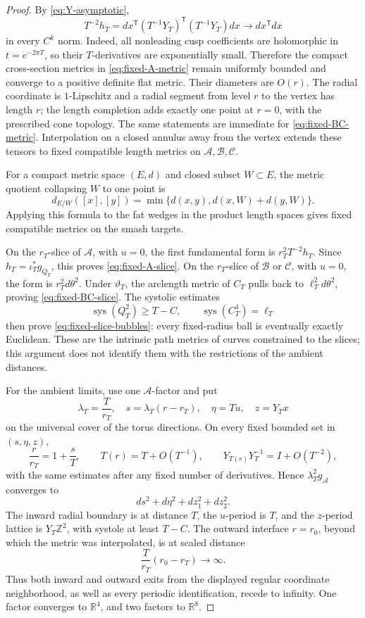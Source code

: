 \documentclass[11pt,letterpaper]{article}
\numberwithin{equation}{section}
\theoremstyle{definition}
\theoremstyle{remark}
\newcommand{\R}{\mathbb R}
\newcommand{\Z}{\mathbb Z}
\newcommand{\sys}{\operatorname{sys}}
\begin{document}
\begin{proof}
By \cref{eq:Y-asymptotic},
\[
 T^{-2}h_T
 =dx^{\mathsf T}(T^{-1}Y_T)^{\mathsf T}(T^{-1}Y_T)dx
 \longrightarrow dx^{\mathsf T}dx
\]
in every \(C^k\) norm.  Indeed, all nonleading cusp coefficients are
holomorphic in \(t=e^{-2\pi T}\), so their \(T\)-derivatives are
exponentially small.  Therefore the compact cross-section metrics in
\cref{eq:fixed-A-metric} remain uniformly bounded and converge to a
positive definite flat metric.  Their diameters are \(O(r)\).  The radial
coordinate is \(1\)-Lipschitz and a radial segment from level \(r\) to the
vertex has length \(r\); the length completion adds exactly one point at
\(r=0\), with the prescribed cone topology.  The same statements are
immediate for \cref{eq:fixed-BC-metric}.  Interpolation on a closed
annulus away from the vertex extends these tensors to fixed compatible
length metrics on \(\mathcal A,\mathcal B,\mathcal C\).

For a compact metric space \((E,d)\) and closed subset \(W\subset E\),
the metric quotient collapsing \(W\) to one point is
\[
 d_{E/W}([x],[y])
 =\min\{d(x,y),d(x,W)+d(y,W)\}.
\]
Applying this formula to the fat wedges in the product length spaces
gives fixed compatible metrics on the smash targets.

On the \(r_T\)-slice of \(\mathcal A\), with \(u=0\), the first
fundamental form is \(r_T^2T^{-2}h_T\).  Since
\(h_T=\iota_T^*g_{Q_T}\), this proves \cref{eq:fixed-A-slice}.  On the
\(r_T\)-slice of \(\mathcal B\) or \(\mathcal C\), with \(u=0\), the
form is \(r_T^2d\theta^2\).  Under \(\vartheta_T\), the arclength metric
of \(C_T\) pulls back to \(\ell_T^2d\theta^2\), proving
\cref{eq:fixed-BC-slice}.  The systolic estimates
\[
 \sys(Q_T^2)\geq T-C,\qquad \sys(C_T^4)=\ell_T
\]
then prove \cref{eq:fixed-slice-bubbles}: every fixed-radius ball is
eventually exactly Euclidean.  These are the intrinsic path metrics of
curves constrained to the slices; this argument does not identify them
with the restrictions of the ambient distances.

For the ambient limits, use one \(\mathcal A\)-factor and put
\[
 \lambda_T=\frac{T}{r_T},\quad
 s=\lambda_T(r-r_T),\quad \eta=Tu,\quad z=Y_Tx
\]
on the universal cover of the torus directions.  On every fixed bounded
set in \((s,\eta,z)\),
\[
 \frac r{r_T}=1+\frac sT,\qquad
 T(r)=T+O(T^{-1}),\qquad
 Y_{T(r)}Y_T^{-1}=I+O(T^{-2}),
\]
with the same estimates after any fixed number of derivatives.  Hence
\(\lambda_T^2g_{\mathcal A}\) converges to
\[
 ds^2+d\eta^2+dz_1^2+dz_2^2.
\]
The inward radial boundary is at distance \(T\), the \(u\)-period is
\(T\), and the \(z\)-period lattice is \(Y_T\Z^2\), with systole at least
\(T-C\).  The outward interface \(r=r_0\), beyond which the metric was
interpolated, is at scaled distance
\[
 \frac{T}{r_T}(r_0-r_T)\longrightarrow\infty.
\]
Thus both inward and outward exits from the displayed regular coordinate
neighborhood, as well as every periodic identification, recede to infinity.
One factor converges to \(\R^4\), and two factors to \(\R^8\).


\end{proof}
\end{document}

